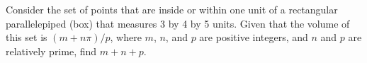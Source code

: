 Consider the set of points that are inside or within one unit of a rectangular parallelepiped (box) that measures 3 by 4 by 5 units.  Given that the volume of this set is $(m + n \pi)/p$, where $m$, $n$, and $p$ are positive integers, and $n$ and $p$ are relatively prime, find $m + n + p$.